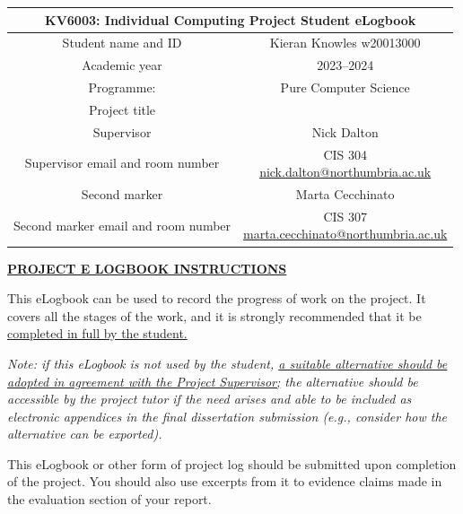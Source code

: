 \documentclass[../CHEFCookingHelper.tex]{subfiles}
\begin{document}
\raggedbottom

\begin{table}[h!]
    \centering
    \begin{tabular}{|c|c|}
        \hline
        \multicolumn{2}{|c|}{KV6003: Individual Computing Project Student eLogbook} \\\hline
        Student name and ID & Kieran Knowles w20013000 \\\hline
        Academic year & 2023--2024 \\\hline
        Programme: & Pure Computer Science \\\hline
        Project title & \chef{} \\\hline
        Supervisor & Nick Dalton \\\hline
        Supervisor email and room number & \makecell[c]{
            CIS 304 \\
            \href{mailto:nick.dalton@northumbria.ac.uk}{nick.dalton@northumbria.ac.uk}
        } \\\hline
        Second marker & Marta Cecchinato \\\hline
        Second marker email and room number & \makecell[c]{
            CIS 307 \\
            \href{mailto:marta.cecchinato@northumbria.ac.uk}{marta.cecchinato@northumbria.ac.uk}
        } \\\hline
    \end{tabular}
\end{table}

\textbf{\underline{PROJECT E LOGBOOK INSTRUCTIONS}}

This eLogbook can be used to record the progress of work on the project. It covers all the stages of the
work, and it is strongly recommended that it be \ul{completed in full by the student.}

\textit{
    Note: if this eLogbook is not used by the student, \ul{a suitable alternative should be adopted in agreement with
    the Project Supervisor;} the alternative should be accessible by the project tutor if the need arises and able
    to be included as electronic appendices in the final dissertation submission (e.g., consider how the alternative
    can be exported).
}

This eLogbook or other form of project log should be submitted upon completion of the project.
You should also use excerpts from it to evidence claims made in the evaluation section of your report.
\end{document}
